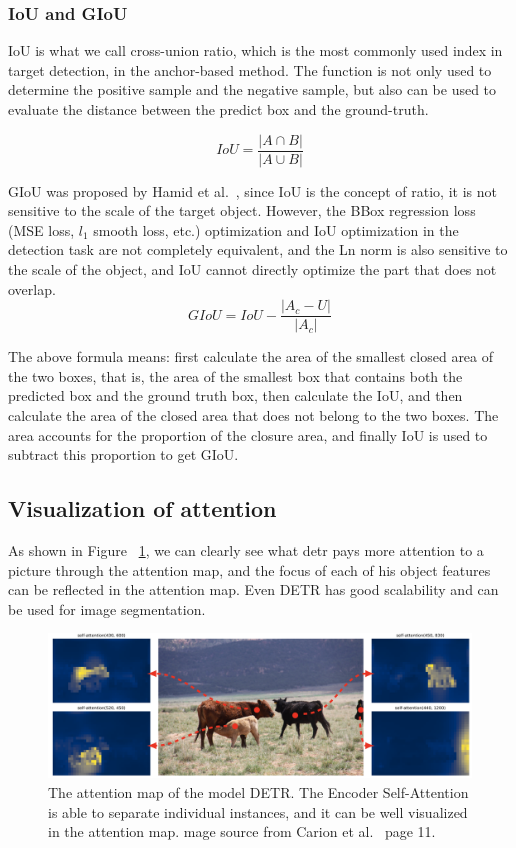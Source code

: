 \subsubsection{IoU and GIoU}

IoU is what we call cross-union ratio, which is the most commonly used index in target detection, in the anchor-based method. The function is not only used to determine the positive sample and the negative sample, but also can be used to evaluate the distance between the predict box and the ground-truth.

$$
I o U=\frac{|A \cap B|}{|A \cup B|}
$$

GIoU was proposed by Hamid et al.~\cite{rezatofighi2019generalized}, since IoU is the concept of ratio, it is not sensitive to the scale of the target object. However, the BBox regression loss (MSE loss, $ l_1 $ smooth loss, etc.) optimization and IoU optimization in the detection task are not completely equivalent, and the Ln norm is also sensitive to the scale of the object, and IoU cannot directly optimize the part that does not overlap.
$$
G I o U=I o U-\frac{\left|A_{c}-U\right|}{\left|A_{c}\right|}
$$

The above formula means: first calculate the area of the smallest closed area of the two boxes, that is, the area of the smallest box that contains both the predicted box and the ground truth box, then calculate the IoU, and then calculate the area of the closed area that does not belong to the two boxes. The area accounts for the proportion of the closure area, and finally IoU is used to subtract this proportion to get GIoU.


\subsection{Visualization of  attention}
As shown in Figure ~\ref{fig:detrattentionmap}, we can clearly see what detr pays more attention to a picture through the attention map, and the focus of each of his object features can be reflected in the attention map. Even DETR has good scalability and can be used for image segmentation.

\begin{figure}[h]
	\centering
	\includegraphics[width=1\linewidth]{figures/detr_attention_map}
	\caption[The attention map of the model DETR]{The attention map of the model DETR. The Encoder Self-Attention is able to separate individual instances, and it can be well visualized in the attention map. mage source from Carion et al.~\cite{carion2020end} page 11.}
	\label{fig:detrattentionmap}
\end{figure}



